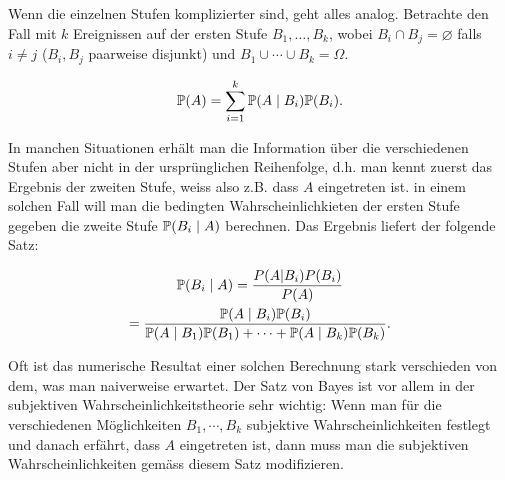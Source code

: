 Wenn die einzelnen Stufen komplizierter sind, geht alles analog. Betrachte den Fall mit $k$ Ereignissen auf der ersten Stufe $B_1,\ldots,B_k$, wobei $B_i\cap B_j=\varnothing$ falls $i\neq j$ ($B_i,B_j$ paarweise disjunkt) und $B_1\cup \cdots \cup B_k=\Omega$.
\begin{satz}
	\begin{gather*}
		\mathbb P(A)=\sum_{i=1}^{k}\mathbb P(A\mid B_i)\mathbb P(B_i).
	\end{gather*}
\end{satz}
In manchen Situationen erhält man die Information über die verschiedenen Stufen aber nicht in der ursprünglichen Reihenfolge, d.h. man kennt zuerst das Ergebnis der zweiten Stufe, weiss also z.B. dass $A$ eingetreten ist. in einem solchen Fall will man die bedingten Wahrscheinlichkieten der ersten Stufe gegeben die zweite Stufe $\mathbb P(B_i\mid A)$ berechnen. Das Ergebnis liefert der folgende Satz:
\begin{satz}
	\begin{multline*}
		\mathbb P(B_i\mid A)=\frac{P(A|B_i)P(B_i)}{P(A)}\\=\frac{\mathbb P(A\mid B_i)\mathbb P(B_i)}{\mathbb P(A\mid B_1)\mathbb P(B_1)+ \cdots+ \mathbb P(A\mid B_k)\mathbb P(B_k)}.
	\end{multline*}
\end{satz}
Oft ist das numerische Resultat einer solchen Berechnung stark verschieden von dem, was man naiverweise erwartet. Der Satz von Bayes ist vor allem in der subjektiven Wahrscheinlichkeitstheorie sehr wichtig: Wenn man für die verschiedenen Möglichkeiten $B_1,\cdots,B_k$ subjektive Wahrscheinlichkeiten festlegt und danach erfährt, dass $A$ eingetreten ist, dann muss man die subjektiven Wahrscheinlichkeiten gemäss diesem Satz modifizieren.
